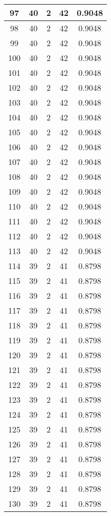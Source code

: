 \documentclass[letterpaper, 12pt]{article}
\begin{document}
\begin{longtable}{|c|c|c|c|c|}
\hline
97 & 40 & 2 & 42 & 0.9048 \\
\hline
98 & 40 & 2 & 42 & 0.9048 \\
\hline
99 & 40 & 2 & 42 & 0.9048 \\
\hline
100 & 40 & 2 & 42 & 0.9048 \\
\hline
101 & 40 & 2 & 42 & 0.9048 \\
\hline
102 & 40 & 2 & 42 & 0.9048 \\
\hline
103 & 40 & 2 & 42 & 0.9048 \\
\hline
104 & 40 & 2 & 42 & 0.9048 \\
\hline
105 & 40 & 2 & 42 & 0.9048 \\
\hline
106 & 40 & 2 & 42 & 0.9048 \\
\hline
107 & 40 & 2 & 42 & 0.9048 \\
\hline
108 & 40 & 2 & 42 & 0.9048 \\
\hline
109 & 40 & 2 & 42 & 0.9048 \\
\hline
110 & 40 & 2 & 42 & 0.9048 \\
\hline
111 & 40 & 2 & 42 & 0.9048 \\
\hline
112 & 40 & 2 & 42 & 0.9048 \\
\hline
113 & 40 & 2 & 42 & 0.9048 \\
\hline
114 & 39 & 2 & 41 & 0.8798 \\
\hline
115 & 39 & 2 & 41 & 0.8798 \\
\hline
116 & 39 & 2 & 41 & 0.8798 \\
\hline
117 & 39 & 2 & 41 & 0.8798 \\
\hline
118 & 39 & 2 & 41 & 0.8798 \\
\hline
119 & 39 & 2 & 41 & 0.8798 \\
\hline
120 & 39 & 2 & 41 & 0.8798 \\
\hline
121 & 39 & 2 & 41 & 0.8798 \\
\hline
122 & 39 & 2 & 41 & 0.8798 \\
\hline
123 & 39 & 2 & 41 & 0.8798 \\
\hline
124 & 39 & 2 & 41 & 0.8798 \\
\hline
125 & 39 & 2 & 41 & 0.8798 \\
\hline
126 & 39 & 2 & 41 & 0.8798 \\
\hline
127 & 39 & 2 & 41 & 0.8798 \\
\hline
128 & 39 & 2 & 41 & 0.8798 \\
\hline
129 & 39 & 2 & 41 & 0.8798 \\
\hline
130 & 39 & 2 & 41 & 0.8798 \\

\end{longtable}
\end{document}
